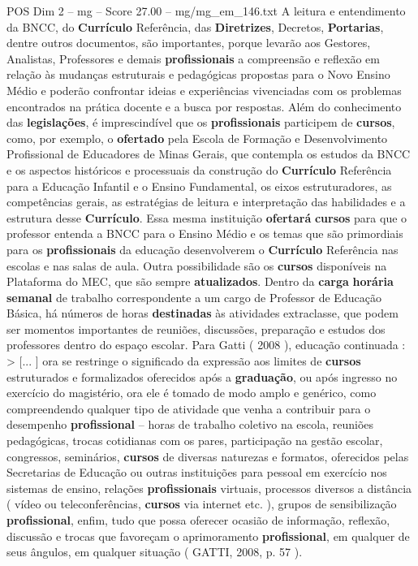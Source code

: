 \begin{textsample}{POS Dim 2 – mg – Score 27.00 – mg/mg\_em\_146.txt}
A leitura e entendimento da BNCC, do \textbf{Currículo} Referência, das \textbf{Diretrizes}, Decretos, \textbf{Portarias}, dentre outros documentos, são importantes, porque levarão aos Gestores, Analistas, Professores e demais \textbf{profissionais} a compreensão e reflexão em relação às mudanças estruturais e pedagógicas propostas para o Novo Ensino Médio e poderão confrontar ideias e experiências vivenciadas com os problemas encontrados na prática docente e a busca por respostas.
Além do conhecimento das \textbf{legislações}, é imprescindível que os \textbf{profissionais} participem de \textbf{cursos}, como, por exemplo, o \textbf{ofertado} pela Escola de Formação e Desenvolvimento Profissional de Educadores de Minas Gerais, que contempla os estudos da BNCC e os aspectos históricos e processuais da construção do \textbf{Currículo} Referência para a Educação Infantil e o Ensino Fundamental, os eixos estruturadores, as competências gerais, as estratégias de leitura e interpretação das habilidades e a estrutura desse \textbf{Currículo}.
Essa mesma instituição \textbf{ofertará} \textbf{cursos} para que o professor entenda a BNCC para o Ensino Médio e os temas que são primordiais para os \textbf{profissionais} da educação desenvolverem o \textbf{Currículo} Referência nas escolas e nas salas de aula.
Outra possibilidade são os \textbf{cursos} disponíveis na Plataforma do MEC, que são sempre \textbf{atualizados}.
Dentro da \textbf{carga} \textbf{horária} \textbf{semanal} de trabalho correspondente a um cargo de Professor de Educação Básica, há números de horas \textbf{destinadas} às atividades extraclasse, que podem ser momentos importantes de reuniões, discussões, preparação e estudos dos professores dentro do espaço escolar.
Para Gatti ( 2008 ), educação continuada : > [... ] ora se restringe o significado da expressão aos limites de \textbf{cursos} estruturados e formalizados oferecidos após a \textbf{graduação}, ou após ingresso no exercício do magistério, ora ele é tomado de modo amplo e genérico, como compreendendo qualquer tipo de atividade que venha a contribuir para o desempenho \textbf{profissional} – horas de trabalho coletivo na escola, reuniões pedagógicas, trocas cotidianas com os pares, participação na gestão escolar, congressos, seminários, \textbf{cursos} de diversas naturezas e formatos, oferecidos pelas Secretarias de Educação ou outras instituições para pessoal em exercício nos sistemas de ensino, relações \textbf{profissionais} virtuais, processos diversos a distância ( vídeo ou teleconferências, \textbf{cursos} via internet etc. ), grupos de sensibilização \textbf{profissional}, enfim, tudo que possa oferecer ocasião de informação, reflexão, discussão e trocas que favoreçam o aprimoramento \textbf{profissional}, em qualquer de seus ângulos, em qualquer situação ( GATTI, 2008, p. 57 ).

\end{textsample}
